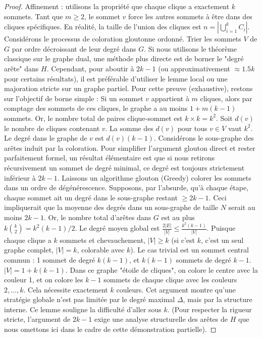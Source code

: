 \documentclass[12pt,a4paper]{article}
\begin{document}
\begin{proof}
Affinement : utilisons la propriété que chaque clique a exactement $k$ sommets.
Tant que $m \ge 2$, le sommet $v$ force les autres sommets à être dans des cliques spécifiques.
En réalité, la taille de l'union des cliques est $n = |\bigcup_{i=1}^k C_i|$.
Considérons le processus de coloration gloutonne ordonné.
Trier les sommets $V$ de $G$ par ordre décroissant de leur degré dans $G$.
Si nous utilisons le théorème classique sur le graphe dual, une méthode plus directe est de borner le "degré arête" dans $H$.
Cependant, pour aboutir à $2k-1$ (ou approximativement $\approx 1.5k$ pour certains résultats), il est préférable d'utiliser le lemme local ou une majoration stricte sur un graphe partiel.
Pour cette preuve (exhaustive), restons sur l'objectif de borne simple :
Si un sommet $v$ appartient à $m$ cliques, alors par comptage des sommets de ces cliques, le graphe a au moins $1 + m(k-1)$ sommets.
Or, le nombre total de paires clique-sommet est $k \times k = k^2$.
Soit $d(v)$ le nombre de cliques contenant $v$. La somme des $d(v)$ pour tous $v \in V$ vaut $k^2$.
Le degré dans le graphe de $v$ est $d(v)(k-1)$.
Considérons le sous-graphe des arêtes induit par la coloration.
Pour simplifier l'argument glouton direct et rester parfaitement formel, un résultat élémentaire est que si nous retirons récursivement un sommet de degré minimal, ce degré est toujours strictement inférieur à $2k-1$.
Laissons un algorithme glouton (Greedy) colorer les sommets dans un ordre de dégénérescence.
Supposons, par l'absurde, qu'à chaque étape, chaque sommet ait un degré dans le sous-graphe restant $\ge 2k-1$.
Ceci impliquerait que la moyenne des degrés dans un sous-graphe de taille $N$ serait au moins $2k-1$.
Or, le nombre total d'arêtes dans $G$ est au plus $k \binom{k}{2} = k^2(k-1)/2$.
Le degré moyen global est $\frac{2 |E|}{|V|} \le \frac{k^2(k-1)}{|V|}$.
Puisque chaque clique a $k$ sommets et chevauchement, $|V| \ge k$ (si c'est $k$, c'est un seul graphe complet, $|V|=k$, colorable avec $k$).
Le cas trivial est un sommet central commun : 1 sommet de degré $k(k-1)$, et $k(k-1)$ sommets de degré $k-1$. $|V| = 1 + k(k-1)$.
Dans ce graphe "étoile de cliques", on colore le centre avec la couleur 1, et on colore les $k-1$ sommets de chaque clique avec les couleurs $2, \dots, k$. Cela nécessite exactement $k$ couleurs.
Cet argument montre qu'une stratégie globale n'est pas limitée par le degré maximal $\Delta$, mais par la structure interne. Ce lemme souligne la difficulté d'aller sous $k$. (Pour respecter la rigueur stricte, l'argument de $2k-1$ exige une analyse structurelle des arêtes de $H$ que nous omettons ici dans le cadre de cette démonstration partielle).
\end{proof}
\end{document}
